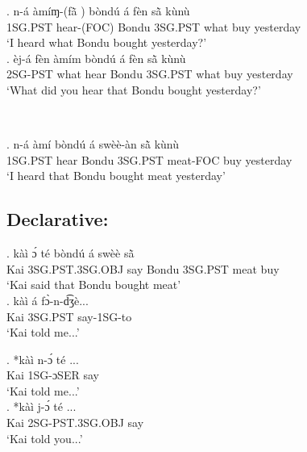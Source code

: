 \documentclass{assets/fieldnotes}
\begin{document}
\exg. n-á àmíɱ-(fã̀ ) bòndú á fèn sã̀  kùnù\\
1SG.PST hear-(FOC) Bondu 3SG.PST what buy yesterday\\
`I heard what Bondu bought yesterday?' \\

\exg. èj-á fèn àmím bòndú á fèn sã̀  kùnù\\
2SG-PST what hear Bondu 3SG.PST what buy yesterday\\
`What did you hear that Bondu bought yesterday?' 

\\


\exg. n-á àmí bòndú á swèè-àn sã̀  kùnù\\
1SG.PST hear Bondu 3SG.PST meat-FOC buy yesterday\\
`I heard that Bondu bought meat yesterday' \\


\subsection{Declarative:}

\exg. kàì ɔ́ té bòndú á swèè sã̀\\
Kai 3SG.PST.3SG.OBJ say Bondu 3SG.PST meat buy\\
`Kai said that Bondu bought meat' \\

\exg. kàì á fɔ̀-n-d͡ʒè...\\
Kai 3SG.PST say-1SG-to \\
`Kai told me...' \\


\exg. *kàì n-ɔ́ té ...\\
Kai 1SG-ɔSER say \\
`Kai told me...' \\

\exg. *kàì j-ɔ́ té ...\\
Kai 2SG-PST.3SG.OBJ say \\
`Kai told you...' \\
\end{document}
